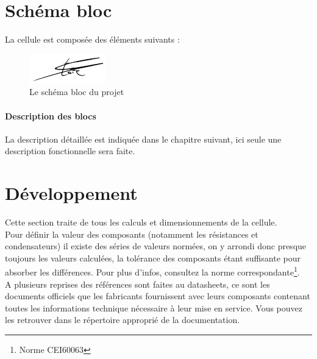 \documentclass[a4paper,10pt]{article}
\begin{document}
  \section{Schéma bloc}
  La cellule est composée des éléments suivants :  
  
 \begin{figure}[!h]
 \centering
 \includegraphics[scale=0.32]{images/signfracheboud}
 \caption{Le schéma bloc du projet}
 \end{figure}
  \paragraph{Description des blocs}
  La description détaillée est indiquée dans le chapitre suivant, ici seule une description fonctionnelle sera faite.
  
  \pagebreak 
  \section{Développement}
  Cette section traite de tous les calculs et dimensionnements de la cellule.\\
  Pour définir la valeur des composants (notamment les résistances et condensateurs) il existe des séries de valeurs normées, on y arrondi donc presque toujours les valeurs calculées, la tolérance des composants étant suffisante pour absorber les différences. Pour plus d'infos, consultez la norme correspondante\footnote{Norme CEI60063}.\\
  A plusieurs reprises des références sont faites au datasheets, ce sont les documents officiels que les fabricants fournissent avec leurs composants contenant toutes les informations technique nécessaire à leur mise en service. Vous pouvez les retrouver dans le répertoire approprié de la documentation.
\end{document}
